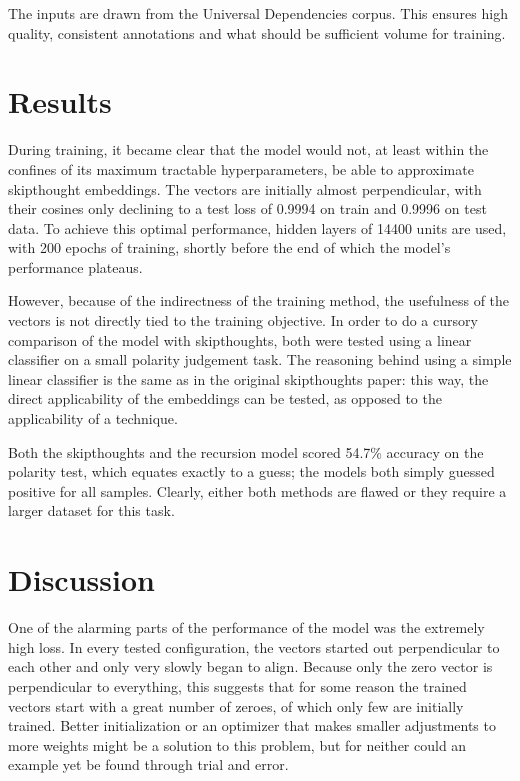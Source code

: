 \documentclass[11pt]{article}
\begin{document}
The inputs are drawn from the Universal Dependencies corpus. This ensures high quality, consistent annotations and what should be sufficient volume for training.

\section{Results}

During training, it became clear that the model would not, at least within the confines of its maximum tractable hyperparameters, be able to approximate skipthought embeddings. The vectors are initially almost perpendicular, with their cosines only declining to a test loss of 0.9994 on train and 0.9996 on test data. To achieve this optimal performance, hidden layers of 14400 units are used, with 200 epochs of training, shortly before the end of which the model's performance plateaus.

However, because of the indirectness of the training method, the usefulness of the vectors is not directly tied to the training objective. In order to do a cursory comparison of the model with skipthoughts, both were tested using a linear classifier on a small polarity judgement task. The reasoning behind using a simple linear classifier is the same as in the original skipthoughts paper: this way, the direct applicability of the embeddings can be tested, as opposed to the applicability of a technique.

Both the skipthoughts and the recursion model scored 54.7\% accuracy on the polarity test, which equates exactly to a guess; the models both simply guessed positive for all samples. Clearly, either both methods are flawed or they require a larger dataset for this task.

\section{Discussion}

One of the alarming parts of the performance of the model was the extremely high loss. In every tested configuration, the vectors started out perpendicular to each other and only very slowly began to align. Because only the zero vector is perpendicular to everything, this suggests that for some reason the trained vectors start with a great number of zeroes, of which only few are initially trained. Better initialization or an optimizer that makes smaller adjustments to more weights might be a solution to this problem, but for neither could an example yet be found through trial and error.
\end{document}
